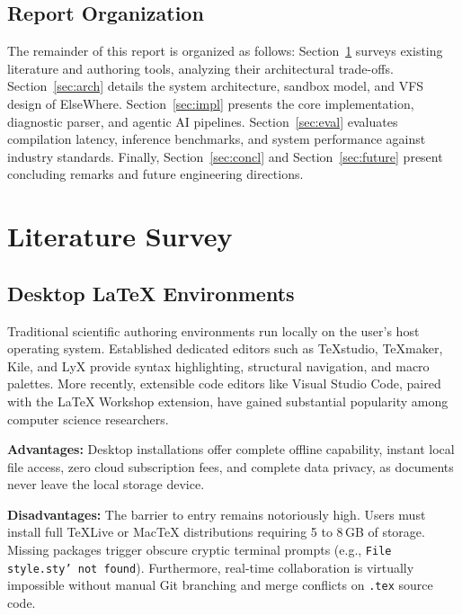 \documentclass[12pt,a4paper]{article}
\newcommand{\code}[1]{\texttt{#1}}
\begin{document}
\subsection{Report Organization}
The remainder of this report is organized as follows: Section~\ref{sec:lit} surveys existing literature and authoring tools, analyzing their architectural trade-offs. Section~\ref{sec:arch} details the system architecture, sandbox model, and VFS design of ElseWhere. Section~\ref{sec:impl} presents the core implementation, diagnostic parser, and agentic AI pipelines. Section~\ref{sec:eval} evaluates compilation latency, inference benchmarks, and system performance against industry standards. Finally, Section~\ref{sec:concl} and Section~\ref{sec:future} present concluding remarks and future engineering directions.

\clearpage
\section{Literature Survey}\label{sec:lit}

\subsection{Desktop \LaTeX{} Environments}
Traditional scientific authoring environments run locally on the user's host operating system. Established dedicated editors such as \TeX{}studio, \TeX{}maker, Kile, and LyX provide syntax highlighting, structural navigation, and macro palettes. More recently, extensible code editors like Visual Studio Code, paired with the \LaTeX{} Workshop extension, have gained substantial popularity among computer science researchers.

\textbf{Advantages:} Desktop installations offer complete offline capability, instant local file access, zero cloud subscription fees, and complete data privacy, as documents never leave the local storage device.

\textbf{Disadvantages:} The barrier to entry remains notoriously high. Users must install full \TeX{}Live or Mac\TeX{} distributions requiring 5 to 8\,GB of storage. Missing packages trigger obscure cryptic terminal prompts (e.g., \code{File \textasciigrave style.sty' not found}). Furthermore, real-time collaboration is virtually impossible without manual Git branching and merge conflicts on \code{.tex} source code.
\end{document}
